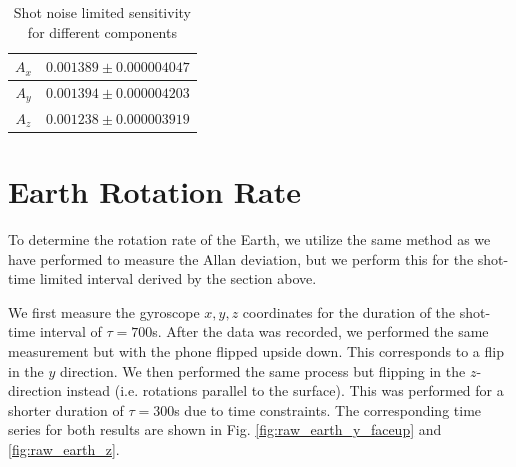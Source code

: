 \documentclass[a4paper]{article}
\begin{document}
\begin{table}
		\centering
\begin{tabular} {|c|c|}
 \hline
 $A_{x}$ & $0.001389 \pm 0.000004047$ \\
 \hline
 $A_{y}$  & $0.001394 \pm 0.000004203 $ \\
 \hline
 $A_{z}$ & $0.001238 \pm 0.000003919$ \\
 \hline
\end{tabular}
\caption{Shot noise limited sensitivity for different components}
\label{tab:A}
\end{table}

\section{Earth Rotation Rate}

To determine the rotation rate of the Earth, we utilize the same method as we have performed to measure the Allan deviation, but we 
perform this for the shot-time limited interval derived by the section above. \par 

We first measure the gyroscope $x, y, z$ coordinates for the duration of the shot-time interval of $\tau = 700$s. After the data was recorded,
we performed the same measurement but with the phone flipped upside down. This corresponds to a flip in the $y$ direction. 
We then performed the same process but flipping in the $z$-direction instead (i.e. rotations parallel to the surface). This was performed for a 
shorter duration of $\tau = 300$s due to time constraints. The corresponding time series for both results are shown in Fig. \ref{fig:raw_earth_y_faceup} and \ref{fig:raw_earth_z}.
\end{document}
